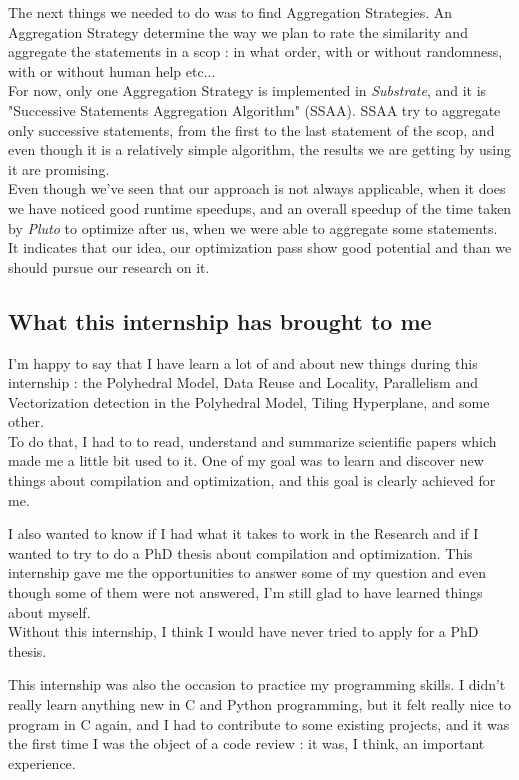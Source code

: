 \documentclass[paper=a4, fontsize=11.5pt]{scrartcl}
\numberwithin{equation}{section}        %
\numberwithin{figure}{section}          %
\numberwithin{table}{section}               %
\begin{document}
The next things we needed to do was to find Aggregation Strategies. An Aggregation Strategy
determine the way we plan to rate the similarity and aggregate the statements in a scop : in what
order, with or without randomness, with or without human help etc...\\
For now, only one Aggregation Strategy is implemented in \textit{Substrate},
and it is "Successive Statements Aggregation Algorithm" (SSAA).
SSAA try to aggregate only successive statements, from the first to the last
statement of the scop, and even though it is a relatively simple algorithm, the results we
are getting by using it are promising.\\
Even though we've seen that our approach is not always applicable, when it does
we have noticed good runtime speedups, and an overall speedup of the time taken by \textit{Pluto}
to optimize after us, when we were able to aggregate some statements. It indicates that our idea,
our optimization pass show good potential and than we should pursue our research on it.

    \subsection{What this internship has brought to me}
        I'm happy to say that I have learn a lot of and about new things during this internship :
        the Polyhedral Model, Data Reuse and Locality, Parallelism and Vectorization detection
        in the Polyhedral Model, Tiling Hyperplane, and some other.\\
        To do that, I had to to read, understand and summarize scientific papers which made
        me a little bit used to it.
        One of my goal was to learn and discover new things about compilation and optimization,
        and this goal is clearly achieved for me.

        I also wanted to know if I had what it takes to work in the Research and if I wanted
        to try to do a PhD thesis about compilation and optimization. This internship gave me
        the opportunities to answer some of my question and even though some of them were
        not answered, I'm still glad to have learned things about myself.\\
        Without this internship, I think I would have never tried to apply for a PhD thesis.

        This internship was also the occasion to practice my programming skills. I didn't
        really learn anything new in C and Python programming, but it felt really nice to
        program in C again, and I had to contribute to some existing projects, and it was
        the first time I was the object of a code review : it was, I think, an important experience.
\end{document}
